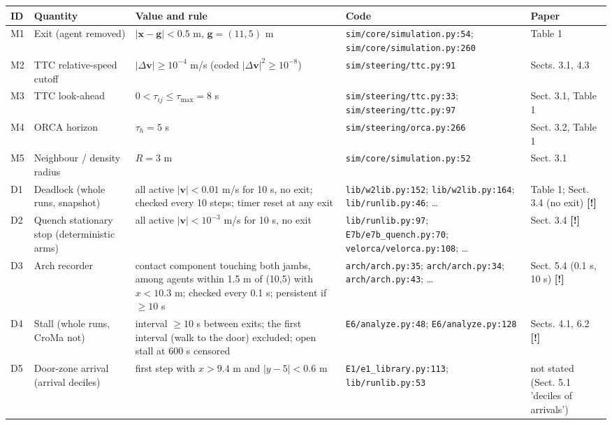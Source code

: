 \begin{tabular}{@{}l>{\raggedright\arraybackslash}p{3.2cm}>{\raggedright\arraybackslash}p{4.6cm}>{\raggedright\arraybackslash}p{3.4cm}>{\raggedright\arraybackslash}p{2.6cm}@{}}
\toprule
ID & Quantity & Value and rule & Code & Paper \\
\midrule
M1 & Exit (agent removed) & $|\mathbf x-\mathbf g|<0.5$ m, $\mathbf g=(11,5)$ m & \texttt{sim/core/simulation.py:54}; \texttt{sim/core/simulation.py:260} & Table 1 \\
M2 & TTC relative-speed cutoff & $|\Delta\mathbf v|\ge10^{-4}$ m/s (coded $|\Delta\mathbf v|^2\ge10^{-8}$) & \texttt{sim/steering/ttc.py:91} & Sects. 3.1, 4.3 \\
M3 & TTC look-ahead & $0<\tau_{ij}\le\tau_{\max}=8$ s & \texttt{sim/steering/ttc.py:33}; \texttt{sim/steering/ttc.py:97} & Sect. 3.1, Table 1 \\
M4 & ORCA horizon & $\tau_h=5$ s & \texttt{sim/steering/orca.py:266} & Sect. 3.2, Table 1 \\
M5 & Neighbour / density radius & $R=3$ m & \texttt{sim/core/simulation.py:52} & Sect. 3.1 \\
\addlinespace
D1 & Deadlock (whole runs, snapshot) & all active $|\mathbf v|<0.01$ m/s for 10 s, no exit; checked every 10 steps; timer reset at any exit & \texttt{lib/w2lib.py:152}; \texttt{lib/w2lib.py:164}; \texttt{lib/runlib.py:46}; \ldots & Table 1; Sect. 3.4 (no exit) \textbf{[!]} \\
D2 & Quench stationary stop (deterministic arms) & all active $|\mathbf v|<10^{-3}$ m/s for 10 s, no exit & \texttt{lib/runlib.py:97}; \texttt{E7b/e7b\_quench.py:70}; \texttt{velorca/velorca.py:108}; \ldots & Sect. 3.4 \textbf{[!]} \\
D3 & Arch recorder & contact component touching both jambs, among agents within 1.5 m of (10,5) with $x<10.3$ m; checked every 0.1 s; persistent if $\ge10$ s & \texttt{arch/arch.py:35}; \texttt{arch/arch.py:34}; \texttt{arch/arch.py:43}; \ldots & Sect. 5.4 (0.1 s, 10 s) \textbf{[!]} \\
D4 & Stall (whole runs, CroMa not) & interval $\ge10$ s between exits; the first interval (walk to the door) excluded; open stall at 600 s censored & \texttt{E6/analyze.py:48}; \texttt{E6/analyze.py:128} & Sects. 4.1, 6.2 \textbf{[!]} \\
D5 & Door-zone arrival (arrival deciles) & first step with $x>9.4$ m and $|y-5|<0.6$ m & \texttt{E1/e1\_library.py:113}; \texttt{lib/runlib.py:53} & not stated (Sect. 5.1 'deciles of arrivals') \\

\end{tabular}
